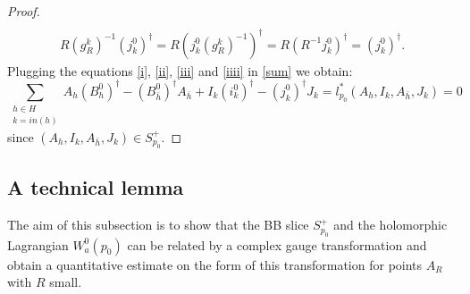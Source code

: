 \documentclass[12pt,oneside,reqno]{amsart}
\theoremstyle{definition}
\numberwithin{equation}{section}
\numberwithin{theorem}{section}
\begin{document}
\begin{proof}
\begin{equation}
\begin{split}
      \end{split}
  \end{equation}
  \begin{equation}\label{iiii}
      \begin{split}
      R(g_R^k)^{-1}(j_k^0)^\dagger =R(j_k^0(g_R^k)^{-1})^\dagger=R(R^{-1}j_k^0)^\dagger=(j_k^0)^\dagger.
      \end{split}
  \end{equation}
  Plugging the equations \eqref{i}, \eqref{ii}, \eqref{iii} and \eqref{iiii} in \eqref{sum} we obtain:
\begin{equation*}
    \sum\limits_{\substack{h\in H\\k=in(h)}}A_h(B_h^0)^\dagger-(B_{\bar h}^0)^\dagger A_{\bar h}+I_k(i_k^0)^\dagger-(j_k^0)^\dagger J_k=l_{p_0}^*(A_h,I_k,A_{\bar h},J_k)=0
\end{equation*}
   since $(A_h,I_k,A_{\bar h},J_k)\in S_{p_0}^+.$
\end{proof}
%

\subsection{A technical lemma}\label{IFT}

The aim of this subsection is to show that the BB slice $S^+_{p_0}$ and the holomorphic Lagrangian $W_a^0(p_0)$ can be related by a complex gauge transformation and obtain a quantitative estimate on the form of this transformation for points $A_R$ with $R$ small. 
\end{document}
